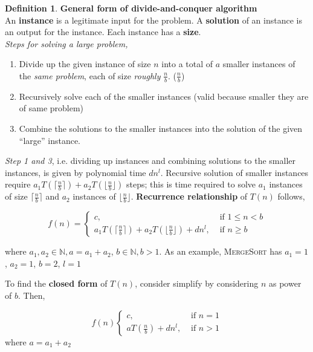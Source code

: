 \documentclass[11pt]{article}
\theoremstyle{plain}%
\theoremstyle{definition}
\newtheorem{defn}{Definition}
\theoremstyle{remark}
\newcommand{\N}{\mathbb{N}}
\begin{document}
\begin{defn}
  \textbf{General form of divide-and-conquer algorithm} \\
  An \textbf{instance} is a legitimate input for the problem. A \textbf{solution} of an instance is an output for the instance. Each instance has a \textbf{size}.\\

  \textit{Steps for solving a large problem,}
  \begin{enumerate}
    \item Divide up the given instance of size $n$ into a total of $a$ smaller instances of the \textit{same problem}, each of size \textit{roughly} $\frac{n}{b}$. ($\frac{n}{b}$)
    \item Recursively solve each of the smaller instances (valid because smaller they are of same problem)
    \item Combine the solutions to the smaller instances into the solution of the given “large” instance.
  \end{enumerate}

  \textit{Step 1 and 3}, i.e. dividing up instances and combining solutions to the smaller instances, is given by polynomial time $dn^l$. Recursive solution of smaller instances require $a_1T(\lceil \frac{n}{b}\rceil) + a_2T(\lfloor \frac{n}{b}\rfloor)$ steps; this is time required to solve $a_1$ instances of size $\lceil \frac{n}{b}\rceil$ and $a_2$ instances of $\lfloor \frac{n}{b}\rfloor$. \textbf{Recurrence relationship} of $T(n)$ follows,

  \begin{equation*}
    f(n) =
    \begin{cases}
      c, & \text{ if }1\leq n < b\\
      a_1T(\lceil \frac{n}{b}\rceil) + a_2T(\lfloor \frac{n}{b}\rfloor) + dn^l, & \text{ if } n\geq b
    \end{cases}
  \end{equation*}

  where $a_1, a_2\in \N, a = a_1 + a_2$, $b\in \N, b>1$. As an example, \textsc{MergeSort} has $a_1 = 1$, $a_2 = 1$, $b = 2$, $l = 1$

  To find the \textbf{closed form} of $T(n)$, consider simplify by considering $n$ as power of $b$. Then,

  \begin{equation*}
    f(n)
    \begin{cases}
      c,  & \text{ if } n = 1\\
      aT(\frac{n}{b}) + dn^l, & \text{ if } n > 1
    \end{cases}
  \end{equation*}
  where $a = a_1 + a_2$


\end{defn}
\end{document}
